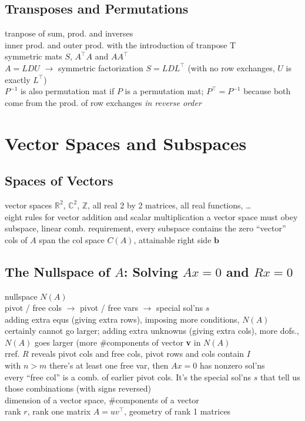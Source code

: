 \documentclass{report}
\begin{document}
\section{Transposes and Permutations}
tranpose of sum, prod. and inverses \\
inner prod. and outer prod. with the introduction of tranpose T \\
symmetric mats $S$, $A^\top A$ and $AA^\top$ \\
$A = LDU$ $\rightarrow$ symmetric factorization $S = LDL^\top$ (with no row exchanges, $U$ is exactly $L^\top$)\\
$P^{-1}$ is also permutation mat if $P$ is a permutation mat; $P^\top = P^{-1}$ because both come from the prod. of row 
exchanges \textit{in reverse order}\\

\chapter{Vector Spaces and Subspaces}
\section{Spaces of Vectors}
vector spaces $\mathbb{R}^2$, $\mathbb{C}^2$, $\mathbb{Z}$, all real 2 by 2 matrices, all real functions, \dots \\
eight rules for vector addition and scalar multiplication a vector space must obey \\
subspace, linear comb. requirement, every subspace contains the zero ``vector'' \\
cols of $A$ span the col space $C(A)$, attainable right side $\mathbf{b}$ \\

\section{The Nullspace of $A$: Solving $Ax = 0$ and $Rx = 0$}
nullspace $N(A)$ \\
pivot / free cols $\rightarrow$ pivot / free vars $\rightarrow$ special sol'ns $s$ \\
adding extra equs (giving extra rows), imposing more conditions, $N(A)$ certainly cannot go larger; 
adding extra unknowns (giving extra cols), more dofs., $N(A)$ goes larger (more \#components of vector \textbf{v} in $N(A)$ \\
rref. $R$ reveals pivot cols and free cols, pivot rows and cols contain $I$ \\
with $n > m$ there's at least one free var, then $Ax = 0$ has nonzero sol'ns \\
every ``free col'' is a comb. of earlier pivot cols. It's the special sol'ns $s$ that tell us those combinations (with signs reversed) \\
dimension of a vector space, \#components of a vector \\
rank $r$, rank one matrix $A = uv^\top$, geometry of rank 1 matrices \\
\end{document}
